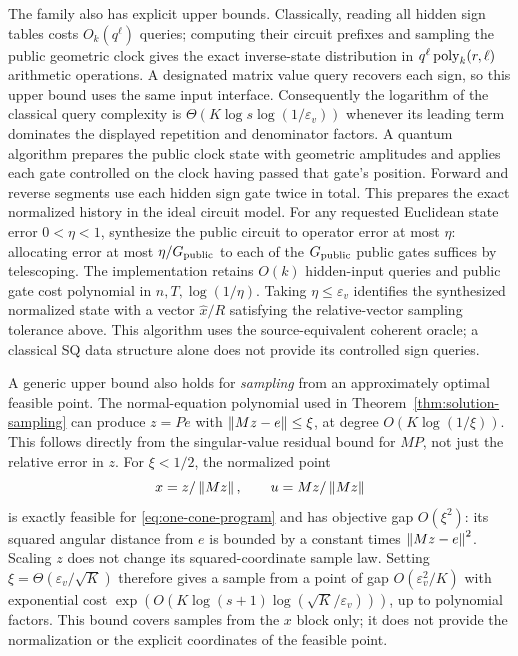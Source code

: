 The family also has explicit upper bounds.  Classically,
reading all hidden sign tables costs $O_k(q^\ell)$ queries; computing
their circuit prefixes and sampling the public geometric clock gives
the exact inverse-state distribution in
$q^\ell\operatorname{poly}_k(r,\ell)$ arithmetic operations.  A designated matrix value query
recovers each sign, so this upper bound uses the same input interface.
Consequently the logarithm of the classical query complexity is
$\Theta(K\log s\log(1/\varepsilon_v))$ whenever its leading term dominates the
displayed repetition and denominator factors.
A quantum algorithm prepares the public clock state with geometric
amplitudes and applies each gate controlled on the clock having passed
that gate's position.  Forward and reverse segments
use each hidden sign gate twice in total. This prepares the exact
normalized history in the ideal circuit model. For any requested Euclidean
state error $0<\eta<1$, synthesize the public circuit to operator error at
most $\eta$: allocating error at most $\eta/G_{\rm public}$ to each of the
$G_{\rm public}$ public gates suffices by telescoping. The
implementation retains $O(k)$ hidden-input queries and public gate cost
polynomial in $n,T,\log(1/\eta)$. Taking $\eta\leq\varepsilon_v$
identifies the synthesized normalized state with a vector $\widehat x/R$
satisfying the relative-vector sampling tolerance above.
This algorithm uses the source-equivalent coherent oracle; a classical
SQ data structure alone does not provide its controlled sign queries.

A generic upper bound also holds for \emph{sampling} from an
approximately optimal feasible point.  The normal-equation polynomial
used in Theorem~\ref{thm:solution-sampling} can produce $z=P e$ with $\left\lVert Mz-e\right\rVert\leq\xi$, at degree
$O(K\log(1/\xi))$.  This follows directly from the singular-value
residual bound for $M P$, not just the relative error in $z$.
For $\xi<1/2$, the normalized point
\[
 x=z/\left\lVert Mz\right\rVert,\qquad u=Mz/\left\lVert Mz\right\rVert
\]
is exactly feasible for \eqref{eq:one-cone-program} and has objective
gap $O(\xi^2)$: its squared angular distance from $e$ is bounded by
a constant times $\left\lVert Mz-e\right\rVert^2$.  Scaling $z$ does not change its
squared-coordinate sample law.  Setting $\xi=\Theta(\varepsilon_v/\sqrt K)$
therefore gives a sample from a point of gap $O(\varepsilon_v^2/K)$ with
exponential cost
$\exp(O(K\log(s+1)\log(\sqrt K/\varepsilon_v)))$, up to polynomial factors.
This bound covers samples from the $x$ block only; it does not provide
the normalization or the explicit coordinates of the feasible point.

